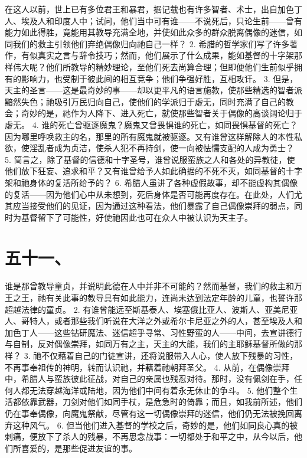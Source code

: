 在这人以前，世上已有多位君王和暴君，据记载也有许多智者、术士，出自加色丁人、埃及人和印度人中；试问，他们当中可有谁——不说死后，只论生前——曾有能力如此得胜，竟能用其教导充满全地，并使如此众多的群众脱离偶像的迷信，如同我们的救主引领他们弃绝偶像归向祂自己一样？ 2. 希腊的哲学家们写了许多著作，有似真实之言与辞令技巧；然而，他们展示了什么成果，能如基督的十字架那样伟大呢？他们所教导的精妙理论，至他们死去尚算合理；但即便他们生前似乎拥有的影响力，也受制于彼此间的相互竞争；他们争强好胜，互相攻讦。 3. 但是，天主的圣言——这是最奇妙的事——却以更平凡的语言施教，使那些精选的智者派黯然失色；祂吸引万民归向自己，使他们的学派归于虚无，同时充满了自己的教会；奇妙的是，祂作为人降下、进入死亡，就使那些智者关于偶像的高谈阔论归于虚无。 4. 谁的死亡曾驱逐魔鬼？魔鬼又曾畏惧谁的死亡，如同畏惧基督的死亡？因为哪里呼唤救主的名，那里的所有魔鬼就被驱逐。又有谁曾这样解除人的本性私欲，使淫乱者成为贞洁，使杀人犯不再持剑，使一向被怯懦支配的人成为勇士？ 5. 简言之，除了基督的信德和十字圣号，谁曾说服蛮族之人和各处的异教徒，使他们放下狂妄、追求和平？又有谁曾给予人如此确据的不死不灭，如同基督的十字架和祂身体的复活所给予的？ 6. 希腊人虽讲了各种虚假故事，却不能虚构其偶像的复活——因为他们心中从未想到，死后身体是否可能再度存在。在此处，人们尤其应当接受他们的见证，因为通过这种看法，他们暴露了自己偶像崇拜的弱点，同时为基督留下了可能性，好使祂因此也可在众人中被认识为天主子。\par


\section{五十一、}

谁是那曾教导童贞，并说明此德在人中并非不可能的？然而基督，我们的救主和万王之王，祂有关此事的教导具有如此能力，连尚未达到法定年龄的儿童，也誓许那超越法律的童贞。 2. 有谁曾能远至斯基泰人、埃塞俄比亚人、波斯人、亚美尼亚人、哥特人，或者那些我们听说在大洋之外或希尔卡尼亚之外的人，甚至埃及人和加色丁人——这些钻研魔法、迷信超乎寻常、习性野蛮的人——中间，去宣讲德行与自制，反对偶像崇拜，如同万有之主，天主的大能，我们的主耶稣基督所做的那样？ 3. 祂不仅藉着自己的门徒宣讲，还将说服带入人心，使人放下残暴的习性，不再事奉祖传的神明，转而认识祂，并藉着祂朝拜圣父。 4. 从前，在偶像崇拜中，希腊人与蛮族彼此征战，对自己的亲属也残忍对待。那时，没有佩剑在手，任何人都无法穿越海洋或陆地，因为他们中间有着永无休止的争斗。 5. 他们整个生活都依靠武器，刀剑对他们如同手杖，是危急时的倚靠；而且，如我前所述，他们仍在事奉偶像，向魔鬼祭献，尽管有这一切偶像崇拜的迷信，他们仍无法被挽回离弃这种风气。 6. 但当他们进入基督的学校之后，奇妙的是，他们如同良心真的被刺痛，便放下了杀人的残暴，不再思念战事：一切都处于和平之中，从今以后，他们所喜爱的，是那些促进友谊的事。\par

